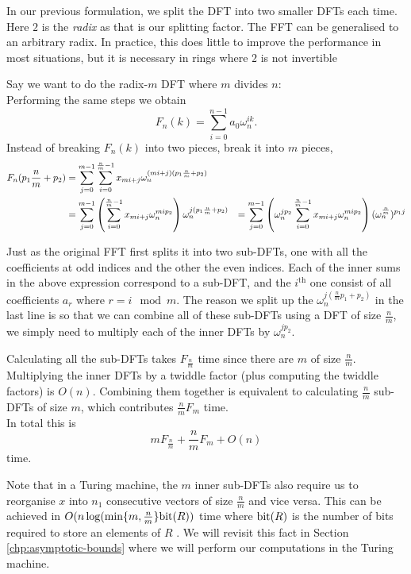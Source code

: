 In our previous formulation, we split the DFT into two smaller DFTs each time. Here $2$ is the \emph{radix} as that is our splitting factor. The FFT can be generalised to an arbitrary radix. In practice, this does little to improve the performance in most situations, but it is necessary in rings where $2$ is not invertible

Say we want to do the radix-$m$ DFT where $m$ divides $n$:\\
Performing the same steps we obtain
\[
    F_n(k) = \sum^{n-1}_{i=0} a_0\omega_n^{ik}.
\]
Instead of breaking $F_n(k)$ into two pieces, break it into $m$ pieces,
\begin{align*}
    F_n(p_1\frac{n}{m} + p_2) &= \sum^{m-1}_{j=0} \sum^{\frac{n}{m}-1}_{i=0} x_{mi + j}\omega_n^{(mi + j)(p_1 \frac{n}{m} + p_2)}\\ 
                              &= \sum^{m-1}_{j=0} \left(\sum^{\frac{n}{m}-1}_{i=0} x_{mi + j}\omega_n^{mi p_2}\right) \omega_n^{j(p_1\frac{n}{m} + p_2)}
                              &= \sum^{m-1}_{j=0} \left(\omega_n^{jp_2}\sum^{\frac{n}{m}-1}_{i=0} x_{mi + j}\omega_n^{mi p_2}\right) (\omega_n^{\frac{n}{m}})^{p_1 j}
\end{align*}


Just as the original FFT first splits it into two sub-DFTs, one with all the coefficients at odd indices and the other the even indices. Each of the inner sums in the above expression correspond to a sub-DFT, and the $i^{\text{th}}$ one consist of all coefficients $a_r$ where $r = i \mod m$. The reason we split up the $\omega_n^{j(\frac{n}{m}p_1 + p_2)}$ in the last line is so that we can combine all of these sub-DFTs using a DFT of size $\frac{n}{m}$, we simply need to multiply each of the inner DFTs by $\omega_n^{jp_2}$.

Calculating all the sub-DFTs takes $F_{\frac{n}{m}}$ time since there are $m$ of size $\frac{n}{m}$. Multiplying the inner DFTs by a twiddle factor (plus computing the twiddle factors) is $O(n)$. Combining them together is equivalent to calculating $\frac{n}{m}$ sub-DFTs of size $m$, which contributes $\frac{n}{m}F_{m}$ time.\\
In total this is
\[
    mF_{\frac{n}{m}} + \frac{n}{m}F_m + O(n)
\]
time.

Note that in a Turing machine, the $m$ inner sub-DFTs also require us to reorganise $x$ into $n_1$ consecutive vectors of size $\frac{n}{m}$ and vice versa. This can be achieved in $O(n \log( \min \{m, \frac{n}{m}\}\textrm{bit}(R))$ time where $\textrm{bit}(R)$ is the number of bits required to store an elements of $R$ \cite{ffnlogn}. We will revisit this fact in Section \ref{chp:asymptotic-bounds} where we will perform our computations in the Turing machine.

